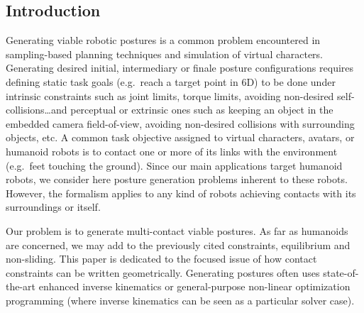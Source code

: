 

\subsection{Introduction}
\label{subsec:intro}

Generating viable robotic postures is a common problem encountered in sampling-based planning techniques and simulation of virtual characters.
Generating desired initial, intermediary or finale posture configurations requires defining static task goals (e.g.\ reach a target point in 6D) to be done under intrinsic constraints such as joint limits, torque limits, avoiding non-desired self-collisions\ldots and perceptual or extrinsic ones such as keeping an object in the embedded camera field-of-view, avoiding non-desired collisions with surrounding objects, etc.
A common task objective assigned to virtual characters, avatars, or humanoid robots is to contact one or more of its links with the environment (e.g.\ feet touching the ground).
Since our main applications target humanoid robots, we consider here posture generation problems inherent to these robots.
However, the formalism applies to any kind of robots achieving contacts with its surroundings or itself.

Our problem is to generate multi-contact viable postures.
As far as humanoids are concerned, we may add to the previously cited constraints, equilibrium and non-sliding.
This paper is dedicated to the focused issue of how contact constraints can be written geometrically.
Generating postures often uses state-of-the-art enhanced inverse kinematics or general-purpose non-linear optimization programming (where inverse kinematics can be seen as a particular solver case).

